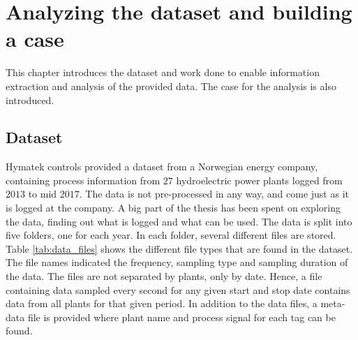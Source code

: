 \chapter{Analyzing the dataset and building a case}\label{cha:data}

This chapter introduces the dataset and work done to enable information extraction and analysis of the provided data. The case for the analysis is also introduced.








\section{Dataset}\label{sec:dataset}
    Hymatek controls provided a dataset from a Norwegian energy company, containing process information from $27$ hydroelectric power plants logged from $2013$ to mid $2017$. The data is not pre-processed in any way, and come just as it is logged at the company. A big part of the thesis has been spent on exploring the data, finding out what is logged and what can be used. The data is split into five folders, one for each year. In each folder, several different files are stored. Table \ref{tab:data_files} shows the different file types that are found in the dataset. The file names indicated the frequency, sampling type and sampling duration of the data. The files are not separated by plants, only by date. Hence, a file containing data sampled every second for any given start and stop date contains data from all plants for that given period. In addition to the data files, a meta-data file is provided where plant name and process signal for each tag can be found.
    
